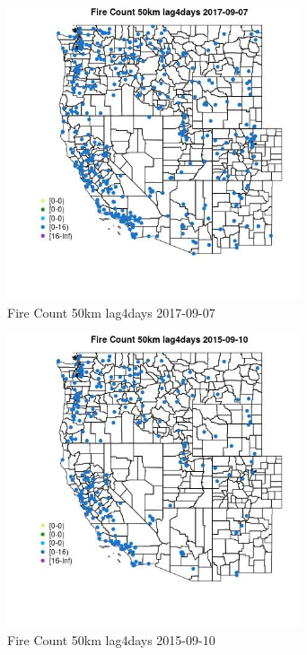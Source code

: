 \begin{figure} 
\centering  
\includegraphics[width=0.77\textwidth]{Code_Outputs/Report_ML_input_PM25_Step4_part_e_de_duplicated_aves_compiled_2019-05-20wNAs_MapObsFire_Count_50km_lag4days2017-09-07.jpg} 
\caption{\label{fig:Report_ML_input_PM25_Step4_part_e_de_duplicated_aves_compiled_2019-05-20wNAsMapObsFire_Count_50km_lag4days2017-09-07}Fire Count 50km lag4days 2017-09-07} 
\end{figure} 
 

\clearpage 

\begin{figure} 
\centering  
\includegraphics[width=0.77\textwidth]{Code_Outputs/Report_ML_input_PM25_Step4_part_e_de_duplicated_aves_compiled_2019-05-20wNAs_MapObsFire_Count_50km_lag4days2015-09-10.jpg} 
\caption{\label{fig:Report_ML_input_PM25_Step4_part_e_de_duplicated_aves_compiled_2019-05-20wNAsMapObsFire_Count_50km_lag4days2015-09-10}Fire Count 50km lag4days 2015-09-10} 
\end{figure} 
 

